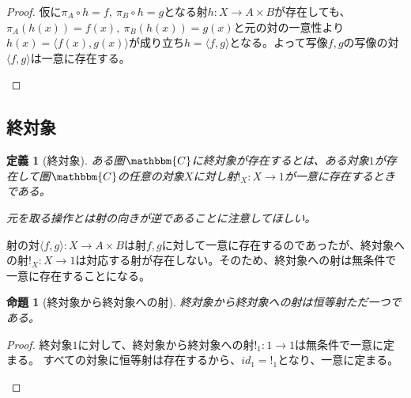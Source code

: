 \documentclass[dvipdfmx]{jsarticle}
\newcommand{\cat}[1]{\mathbbm{#1}}
\newcommand{\arrow}{\rightarrow}
\newcommand{\tuple}[1]{\langle #1\rangle}
\newcommand{\mor}[3]{#1:#2\arrow #3}
\newtheorem{proof}{証明}[section]
\newtheorem{prop}{命題}[section]
\newtheorem{define}{定義}[section]
\numberwithin{proof}{subsection}
\numberwithin{prop}{subsection}
\numberwithin{define}{subsection}
\begin{document}
\begin{proof}
		仮に$\pi_A\circ h=f,\ \pi_B\circ h=g$となる射$\mor{h}{X}{A\times B}$が存在しても、
		$\pi_A(h(x))=f(x),\ \pi_B(h(x))=g(x)$と元の対の一意性より$h(x)=\tuple{f(x),g(x)}$が成り立ち$h=\tuple{f,g}$となる。よって写像$f,g$の写像の対$\tuple{f,g}$は一意に存在する。
		\begin{center}
		\end{center}
	\end{proof}
	\subsection{終対象}
	\begin{define}[終対象]
		ある圏$\cat{C}$に終対象が存在するとは、ある対象$1$が存在して圏$\cat{C}$の任意の対象$X$に対し射$\mor{!_X}{X}{1}$が一意に存在するときである。

		元を取る操作とは射の向きが逆であることに注意してほしい。
	\end{define}
	射の対$\mor{\tuple{f,g}}{X}{A\times B}$は射$f,g$に対して一意に存在するのであったが、終対象への射$\mor{!_X}{X}{1}$は対応する射が存在しない。そのため、終対象への射は無条件で一意に存在することになる。
	\begin{prop}[終対象から終対象への射]
		終対象から終対象への射は恒等射ただ一つである。
	\end{prop}
	\begin{proof}
		終対象$1$に対して、終対象から終対象への射$\mor{!_1}{1}{1}$は無条件で一意に定まる。
		すべての対象に恒等射は存在するから、$id_1=!_1$となり、一意に定まる。
		\begin{center}
		\end{center}
	\end{proof}
\end{document}
